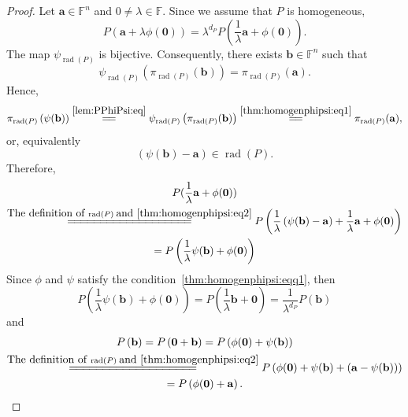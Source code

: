 \documentclass[10pt,a4paper]{amsart}
\def\F{{\mathbb F}}
\DeclareMathOperator{\rad}{rad}
\begin{document}
\begin{proof}
Let $\mathbf a \in \F^n$ and $0 \neq \lambda \in \F$. Since we assume that $P$ is homogeneous,
\begin{equation}\label{thm:homogenphipsi:eq5}
P\left(\mathbf a + \lambda \phi (\mathbf 0)\right) = \lambda^{d_P} P\left(\frac{1}{\lambda}\mathbf a + \phi (\mathbf 0)\right).
\end{equation}
The map $\psi_{\rad(P)}$ is bijective. Consequently, there exists $\mathbf b \in \F^n$ such that 
\begin{equation}\label{thm:homogenphipsi:eq1}
\psi_{\rad(P)}\left(\pi_{\rad(P)}(\mathbf b)\right) = \pi_{\rad(P)}(\mathbf a).
\end{equation}
Hence,
\begin{equation*}
\pi_{\rad(P)} \left(\psi(\mathbf b)\right) \overset{\eqref{lem:PPhiPsi:eq}}{=\joinrel=} \psi_{\rad(P)}\left(\pi_{\rad(P)}(\mathbf b)\right)  \overset{\eqref{thm:homogenphipsi:eq1}}{=\joinrel=} \pi_{\rad(P)}(\mathbf a),
\end{equation*}
or, equivalently
\begin{equation}\label{thm:homogenphipsi:eq2}
\left(\psi (\mathbf b) - \mathbf a\right) \in \rad(P). 
\end{equation}
Therefore,
\begin{multline}\label{thm:homogenphipsi:eq6}
P(\frac{1}{\lambda}\mathbf a + \phi (\mathbf 0))\\ \overset{\mbox{\scriptsize The definition of}\;\rad(P)\;\mbox{\scriptsize and~\eqref{thm:homogenphipsi:eq2}}}{=\joinrel=\joinrel=\joinrel=\joinrel=\joinrel=\joinrel=\joinrel=\joinrel=\joinrel=\joinrel=\joinrel=\joinrel=\joinrel=\joinrel=\joinrel=\joinrel=\joinrel=\joinrel=} P\left(\frac{1}{\lambda} \left(\psi (\mathbf b) - \mathbf a\right) + \frac{1}{\lambda}\mathbf a + \phi (\mathbf 0)\right)\\ = P\left(\frac{1}{\lambda}\psi (\mathbf b) + \phi (\mathbf 0)\right)
\end{multline}
Since $\phi$ and $\psi$ satisfy the condition~\eqref{thm:homogenphipsi:eqq1}, then
\begin{equation}\label{thm:homogenphipsi:eq3}
P\left(\frac{1}{\lambda}\psi (\mathbf b) + \phi (\mathbf 0)\right) = P\left(\frac{1}{\lambda}\mathbf b + \mathbf 0\right) = \frac{1}{\lambda^{d_P}}P\left(\mathbf b\right)
\end{equation}
and
\begin{multline}\label{thm:homogenphipsi:eq4}
P\left(\mathbf b\right) = P\left(\mathbf 0 + \mathbf b\right) = P\left(\phi(\mathbf 0) + \psi(\mathbf b)\right)\\ \overset{\mbox{\scriptsize The definition of}\;\rad(P)\;\mbox{\scriptsize and~\eqref{thm:homogenphipsi:eq2}}}{=\joinrel=\joinrel=\joinrel=\joinrel=\joinrel=\joinrel=\joinrel=\joinrel=\joinrel=\joinrel=\joinrel=\joinrel=\joinrel=\joinrel=\joinrel=\joinrel=\joinrel=\joinrel=}
P\left(\phi(\mathbf 0) + \psi(\mathbf b) + \left(\mathbf a - \psi(\mathbf b)\right)\right)\\
=  P\left(\phi(\mathbf 0) + \mathbf a\right).
\end{multline}



\end{proof}
\end{document}
